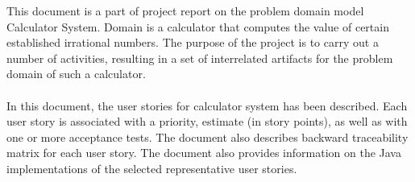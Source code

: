 This document is a part of project report on the problem domain model Calculator System. Domain is a calculator that computes the value of certain established irrational numbers. The purpose of the project is to carry out a number of activities, resulting in a set of interrelated artifacts for the problem domain of such a calculator.\\ \\
In this document, the user stories for calculator system has been described. Each user story is associated with a priority, estimate (in story points), as well as with one or more acceptance tests. The document also describes backward traceability matrix for each user story. The document also provides information on the Java implementations of the selected representative user stories.
